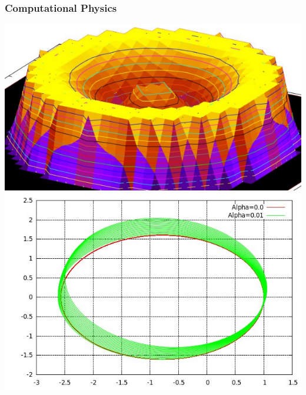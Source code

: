 \documentclass[../resume.tex]{subfiles}
\begin{document}
\subsubsection{Computational Physics}
\noindent
\includegraphics[scale=0.3]{../scientific/bundt.png} 
\includegraphics[scale=0.25]{../scientific/chaotic_orbits.png} 
\end{document}

